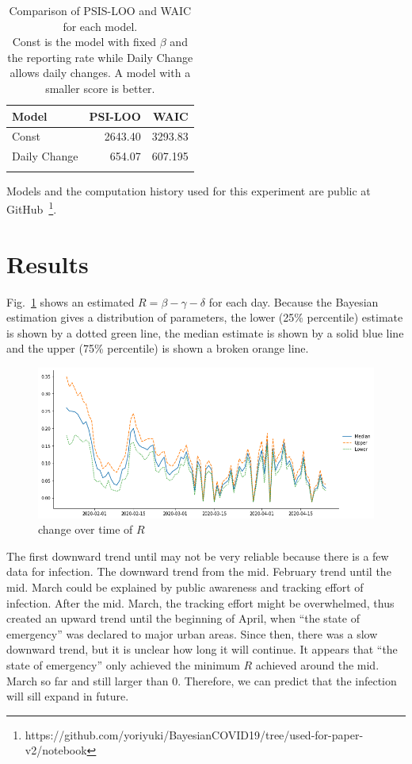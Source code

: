 \documentclass{amsart}
\begin{document}
\begin{table}[h]
\begin{center}
\begin{tabular}{lrr} \toprule
Model & PSI-LOO & WAIC \\ \midrule 
Const & 2643.40 &  3293.83 \\ 
Daily Change & 654.07 & 607.195 \\
\bottomrule\\
\end{tabular}
\caption{Comparison of PSIS-LOO and WAIC for each model.\\
Const is the model with fixed $\beta$ and the reporting rate while Daily Change allows daily changes.  A model with a smaller score is better.}
\label{tbl:IC}
\end{center}
\end{table}

Models and the computation history used for this experiment are public at GitHub~\footnote{https://github.com/yoriyuki/BayesianCOVID19/tree/used-for-paper-v2/notebook}.

\section{Results}

Fig.~\ref{fig:b} shows an estimated $R = \beta - \gamma - \delta$ for each day.
Because the Bayesian estimation gives a distribution of parameters, the lower (25\% percentile) estimate is shown by a dotted green line, the median estimate is shown by a solid blue line and the upper (75\% percentile) is shown a broken orange line.
\begin{figure}[h]
 \centering
 \includegraphics[width=\linewidth]{fig/beta-Japan.png}
 \caption{ change over time of $R$}
 \label{fig:b}
\end{figure}
The first downward trend until may not be very reliable because there is a few data for infection.
The downward trend from the mid. February trend until the mid. March could be explained by public awareness and tracking effort of infection.
After the mid. March, the tracking effort might be overwhelmed, thus created an upward trend until the beginning of April, when ``the state of emergency'' was declared to major urban areas.
Since then, there was a slow downward trend, but it is unclear how long it will continue.
It appears that ``the state of emergency'' only achieved the minimum $R$ achieved around the mid. March so far and still larger than 0.
Therefore, we can predict that the infection will sill expand in future.
\end{document}
